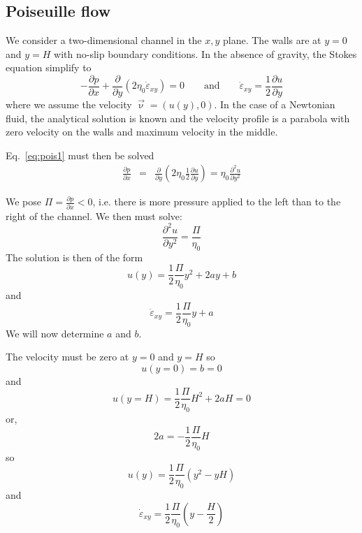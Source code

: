 \subsection{Poiseuille flow} \label{ss:poiseuille}

We consider a two-dimensional channel in the $x,y$ plane. The walls 
are at $y=0$ and $y=H$ with no-slip boundary conditions. 
In the absence of gravity, the Stokes equation simplify to 
\begin{equation}
-\frac{\partial p}{\partial x}  +\frac{\partial }{\partial y} (2\eta_0 \dot{\varepsilon}_{xy}) =0
\qquad
\text{and}
\qquad
\dot{\varepsilon}_{xy} = \frac{1}{2} \frac{\partial u}{\partial y} 
\label{eq:pois1}
\end{equation}
where we assume the velocity $\vec\upnu=(u(y),0)$.
In the case of a Newtonian fluid, the analytical solution is 
known and the velocity profile is a parabola with zero velocity on the
walls and maximum velocity in the middle. 


Eq.~\eqref{eq:pois1} must then be solved 
\begin{eqnarray}
\frac{\partial p}{\partial x}  
&=&\frac{\partial }{\partial y} \left(2\eta_{0}  \frac{1}{2}\frac{\partial u}{\partial y} \right) 
= \eta_0 \frac{\partial^2 u}{\partial y^2}  
\end{eqnarray}

We pose $\Pi=\frac{\partial p}{\partial x}<0$, i.e. 
there is more pressure applied to the left than to the right of the channel.
We then must solve:
\[
\frac{\partial^2 u}{\partial y^2} = \frac{\Pi}{\eta_0} 
\]
The solution is then of the form
\[
u(y) = \frac{1}{2}\frac{\Pi}{\eta_0} y^2 + 2a y + b
\]
and 
\[
\dot{\varepsilon}_{xy}= \frac{1}{2} \frac{\Pi}{\eta_0}y  + a
\]
We will now determine $a$ and $b$.

The velocity must be zero at $y=0$ and $y=H$ so 
\[
u(y=0)=b=0
\] 
and 
\[
u(y=H)=\frac{1}{2}\frac{\Pi}{\eta_0} H^2 + 2a H =0
\]
or, 
\[
2a=-\frac{1}{2}\frac{\Pi}{\eta_0} H
\]
so 
\begin{equation}
\boxed{
u(y) = \frac{1}{2}\frac{\Pi}{\eta_0} (y^2 - y H)
}
\end{equation}
and 
\begin{equation}
\boxed{
\dot{\varepsilon}_{xy}= \frac{1}{2} \frac{\Pi}{\eta_0} \left(y  - \frac{H}{2} \right)
}
\end{equation}
 


 












